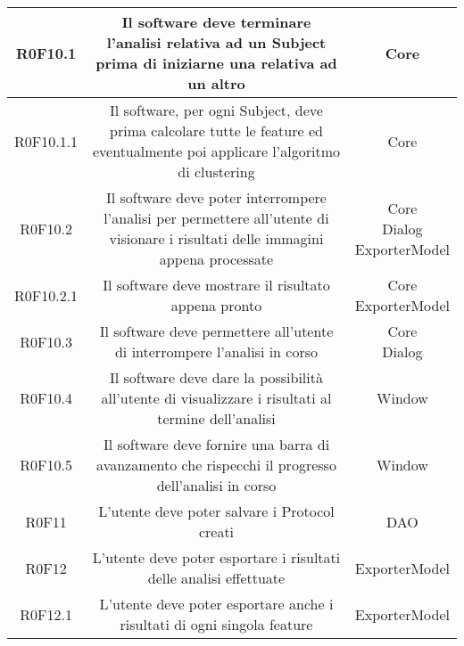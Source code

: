 \begin{center}
\begin{longtable}{|c|c|c|}
\hline
R0F10.1   & \parbox[t]{\larghezza}{Il software deve terminare l'analisi relativa ad un Subject prima di iniziarne una relativa ad un altro}  & \parbox[t]{\dimFonti}{ Core \\} \\
\hline
R0F10.1.1   & \parbox[t]{\larghezza}{Il software, per ogni Subject, deve prima calcolare tutte le feature ed  eventualmente poi applicare l'algoritmo di clustering}  & \parbox[t]{\dimFonti}{ Core \\} \\
\hline
R0F10.2   & \parbox[t]{\larghezza}{Il software deve poter interrompere l'analisi per permettere all'utente di visionare i risultati delle immagini appena processate}  & \parbox[t]{\dimFonti}{ Core \\ Dialog \\ ExporterModel \\} \\
\hline
R0F10.2.1   & \parbox[t]{\larghezza}{Il software deve mostrare il risultato appena pronto}  & \parbox[t]{\dimFonti}{ Core \\ ExporterModel \\} \\
\hline
R0F10.3   & \parbox[t]{\larghezza}{Il software deve permettere all'utente di interrompere l'analisi in corso}  & \parbox[t]{\dimFonti}{ Core \\ Dialog \\} \\
\hline
R0F10.4   & \parbox[t]{\larghezza}{Il software deve dare la possibilità all'utente di visualizzare i risultati al termine dell'analisi}  & \parbox[t]{\dimFonti}{ Window \\} \\
\hline
R0F10.5   & \parbox[t]{\larghezza}{Il software deve fornire una barra di avanzamento che rispecchi il progresso dell'analisi in corso}  & \parbox[t]{\dimFonti}{ Window \\} \\
\hline
R0F11   & \parbox[t]{\larghezza}{L'utente deve poter salvare i Protocol creati}  & \parbox[t]{\dimFonti}{ DAO \\} \\
\hline
R0F12   & \parbox[t]{\larghezza}{L'utente deve poter esportare i risultati delle analisi effettuate}  & \parbox[t]{\dimFonti}{ ExporterModel \\} \\
\hline
R0F12.1   & \parbox[t]{\larghezza}{L'utente deve poter esportare anche i risultati di ogni singola feature}  & \parbox[t]{\dimFonti}{ ExporterModel \\} \\

\end{longtable}
\end{center}
